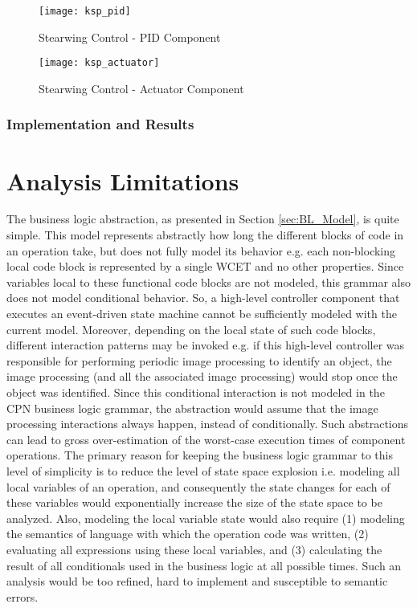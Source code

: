 \begin{figure}[h]
	\centering
	\texttt{[image: ksp\_pid]}
	\caption{Stearwing Control - PID Component}
	\label{fig:ksp_pid}
\end{figure} 
\FloatBarrier 

\begin{figure}[h]
	\centering
	\texttt{[image: ksp\_actuator]}
	\caption{Stearwing Control - Actuator Component}
	\label{fig:ksp_actuator}
\end{figure} 
\FloatBarrier 


\subsubsection{Implementation and Results}

\section{Analysis Limitations}

The business logic abstraction, as presented in Section \ref{sec:BL_Model}, is quite simple. This model represents abstractly how long the different blocks of code in an operation take, but does not fully model its behavior e.g. each non-blocking local code block is represented by a single WCET and no other properties. Since variables local to these functional code blocks are not modeled, this grammar also does not model conditional behavior. So, a high-level controller component that executes an event-driven state machine cannot be sufficiently modeled with the current model. Moreover, depending on the local state of such code blocks, different interaction patterns may be invoked e.g. if this high-level controller was responsible for performing periodic image processing to identify an object, the image processing (and all the associated image processing) would stop once the object was identified. Since this conditional interaction is not modeled in the CPN business logic grammar, the abstraction would assume that the image processing interactions always happen, instead of conditionally. Such abstractions can lead to gross over-estimation of the worst-case execution times of component operations. The primary reason for keeping the business logic grammar to this level of simplicity is to reduce the level of state space explosion i.e. modeling all local variables of an operation, and consequently the state changes for each of these variables would exponentially increase the size of the state space to be analyzed. Also, modeling the local variable state would also require (1) modeling the semantics of language with which the operation code was written, (2) evaluating all expressions using these local variables, and (3) calculating the result of all conditionals used in the business logic at all possible times. Such an analysis would be too refined, hard to implement and susceptible to semantic errors. 



